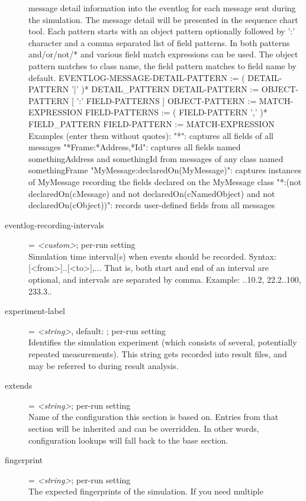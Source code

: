 \begin{description}
    message detail information into the eventlog for each message sent during
    the simulation. The message detail will be presented in the sequence chart
    tool. Each pattern starts with an object pattern optionally followed by ':'
    character and a comma separated list of field patterns. In both patterns
    and/or/not/* and various field match expressions can be used. The object
    pattern matches to class name, the field pattern matches to field name by
    default.
      EVENTLOG-MESSAGE-DETAIL-PATTERN := ( DETAIL-PATTERN '|' )*
    DETAIL\_PATTERN
      DETAIL-PATTERN := OBJECT-PATTERN [ ':' FIELD-PATTERNS ]
      OBJECT-PATTERN := MATCH-EXPRESSION
      FIELD-PATTERNS := ( FIELD-PATTERN ',' )* FIELD\_PATTERN
      FIELD-PATTERN := MATCH-EXPRESSION
    Examples (enter them without quotes):
      "*": captures all fields of all messages
      "*Frame:*Address,*Id": captures all fields named somethingAddress and
    somethingId from messages of any class named somethingFrame
      "MyMessage:declaredOn(MyMessage)": captures instances of MyMessage
    recording the fields declared on the MyMessage class
      "*:(not declaredOn(cMessage) and not declaredOn(cNamedObject) and not
    declaredOn(cObject))": records user-defined fields from all messages
\item[eventlog-recording-intervals] = \textit{<custom>}; per-run setting \\
    Simulation time interval(s) when events should be recorded. Syntax:
    [<from>]..[<to>],... That is, both start and end of an interval are
    optional, and intervals are separated by comma. Example: ..10.2, 22.2..100,
    233.3..
\item[experiment-label] = \textit{<string>}, default: ; per-run setting \\
    Identifies the simulation experiment (which consists of several,
    potentially repeated measurements). This string gets recorded into result
    files, and may be referred to during result analysis.
\item[extends] = \textit{<string>}; per-run setting \\
    Name of the configuration this section is based on. Entries from that
    section will be inherited and can be overridden. In other words,
    configuration lookups will fall back to the base section.
\item[fingerprint] = \textit{<string>}; per-run setting \\
    The expected fingerprints of the simulation. If you need multiple

\end{description}
